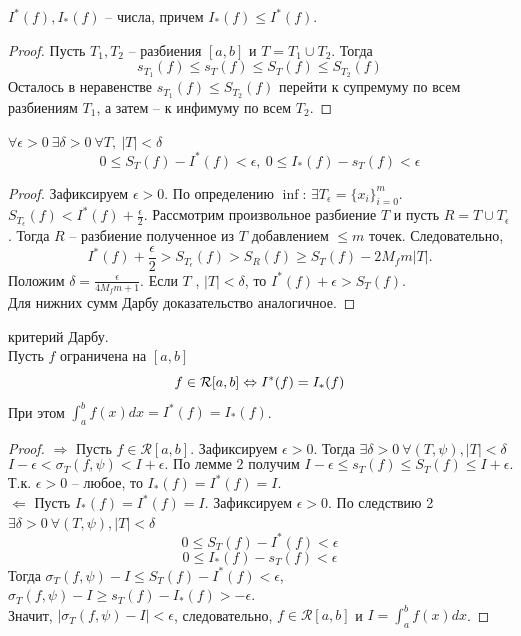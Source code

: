 \begin{corollary}
    $I^{*}(f) , I_{*}(f)$ -- числа, причем $I_{*}(f) \leq I^{*}(f).$
\end{corollary}

\begin{proof}
    Пусть $T_{1}, T_{2}$ -- разбиения $[a, b]$ и $T = T_{1} \cup T_{2}$. Тогда
    \[s_{T_{1}}(f) \leq s_{T}(f) \leq S_{T}(f) \leq S_{T_{2}}(f)\]
    Осталось в неравенстве $s_{T_{1}}(f) \leq S_{T_{2}}(f)$ перейти к супремуму по всем разбиениям $T_{1}$, а затем -- к инфимуму по всем $T_{2}$.
\end{proof}

\begin{corollary}
    $\forall \epsilon > 0 \ \exists \delta > 0 \ \forall T, \ |T| < \delta$
    \[0 \leq S_{T}(f) - I^{*}(f) < \epsilon, \  0 \leq I_{*}(f) - s_{T}(f) < \epsilon\]
\end{corollary}

\begin{proof}
    Зафиксируем $\epsilon > 0$. По определению $\inf$: $\exists T_{\epsilon} = \{x_{i}\}_{i=0}^{m}$.\\
    $S_{T_{\epsilon}}(f) < I^{*}(f) + \frac{\epsilon}{2}$.
    Рассмотрим произвольное разбиение $T$ и пусть $R = T \cup T_{\epsilon}$. Тогда $R$ -- разбиение полученное из $T$ добавлением $\leq m$ точек. Следовательно, 
    \[I^{*}(f) + \frac{\epsilon}{2} > S_{T_{\epsilon}}(f) > S_{R}(f) \geq S_{T}(f) - 2M_{f}m|T|.\]
    Положим $\delta = \frac{\epsilon}{4M_{f}m + 1}$. Если $T$ , $|T| < \delta$, то $I^{*}(f) + \epsilon > S_{T}(f)$.\\
    Для нижних сумм Дарбу доказательство аналогичное.
\end{proof}

\begin{theorem}
    критерий Дарбу.\\
    Пусть $f$ ограничена на $[a,b]$
    \[f \in \mathcal{R}[a,b] \Leftrightarrow I^{*}(f) = I_{*}(f)\]
    При этом $\int_{a}^{b} f(x) dx = I^{*}(f) = I_{*}(f)$.
\end{theorem}

\begin{proof}
    $\Rightarrow$ Пусть $f \in \mathcal{R}[a,b]$. Зафиксируем $\epsilon > 0$. Тогда $\exists \delta > 0 \ \forall(T, \psi), |T| < \delta$
    \[I - \epsilon < \sigma_{T}(f, \psi) < I + \epsilon. \text{ По лемме 2 получим } I - \epsilon \leq s_{T}(f) \leq S_{T}(f) \leq I + \epsilon.\]
    Т.к. $\epsilon > 0$ -- любое, то $I_{*}(f) = I^{*}(f) = I$.\\
    $\Leftarrow$ Пусть  $I_{*}(f) = I^{*}(f) = I$. Зафиксируем $\epsilon > 0$. По следствию 2 $\exists \delta > 0 \ \forall(T, \psi), |T| < \delta$
    \[0 \leq S_{T}(f) - I^{*}(f) < \epsilon\]
    \[0 \leq I_{*}(f) - s_{T}(f) < \epsilon\]
    Тогда $\sigma_{T}(f, \psi) - I \leq S_{T}(f) - I^{*}(f) < \epsilon$, 
    $\sigma_{T}(f, \psi) - I \geq s_{T}(f) - I_{*}(f) > -\epsilon$.\\
    Значит, $|\sigma_{T}(f, \psi) - I| < \epsilon$, следовательно, $f \in \mathcal{R}[a,b]$ и $I = \int_{a}^{b}f(x)dx$.
\end{proof}

